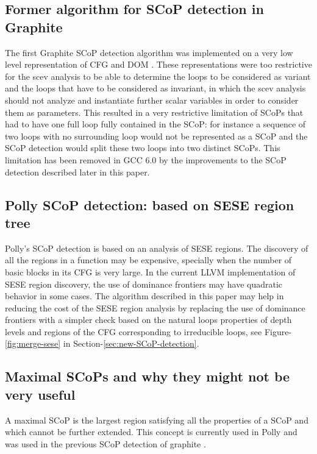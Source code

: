 \documentclass{sigplanconf}
\begin{document}
\subsection{Former algorithm for SCoP detection in Graphite}
\label{subsec:graphite-SCoP}
The first Graphite SCoP detection algorithm was implemented on a very low level
representation of CFG and DOM \cite{trifunovic}.  These representations were too
restrictive for the scev analysis to be able to determine the loops to be
considered as variant and the loops that have to be considered as invariant, in
which the scev analysis should not analyze and instantiate further scalar
variables in order to consider them as parameters.  This resulted in a very
restrictive limitation of SCoPs that had to have one full loop fully contained
in the SCoP: for instance a sequence of two loops with no surrounding loop would
not be represented as a SCoP and the SCoP detection would split these two loops
into two distinct SCoPs.  This limitation has been removed in GCC 6.0 by the
improvements to the SCoP detection described later in this paper.

\subsection{Polly SCoP detection: based on SESE region tree}
\label{subsec:polly-SCoP}
Polly's SCoP detection is based on an analysis of SESE regions.  The discovery
of all the regions in a function may be expensive, specially when the number of
basic blocks in its CFG is very large.  In the current LLVM implementation of
SESE region discovery, the use of dominance frontiers may have quadratic
behavior in some cases.  The algorithm described in this paper may help in
reducing the cost of the SESE region analysis by replacing the use of dominance
frontiers with a simpler check based on the natural loops properties of depth
levels and regions of the CFG corresponding to irreducible loops, see
Figure-\ref{fig:merge-sese} in Section-\ref{sec:new-SCoP-detection}.

\subsection{Maximal SCoPs and why they might not be very useful}
\label{subsec:maximality}
A maximal SCoP is the largest region satisfying all the properties of a SCoP and
which cannot be further extended.  This concept is currently used in Polly
\cite{polly} and was used in the previous SCoP detection of graphite
\cite{graphite}.
\end{document}
